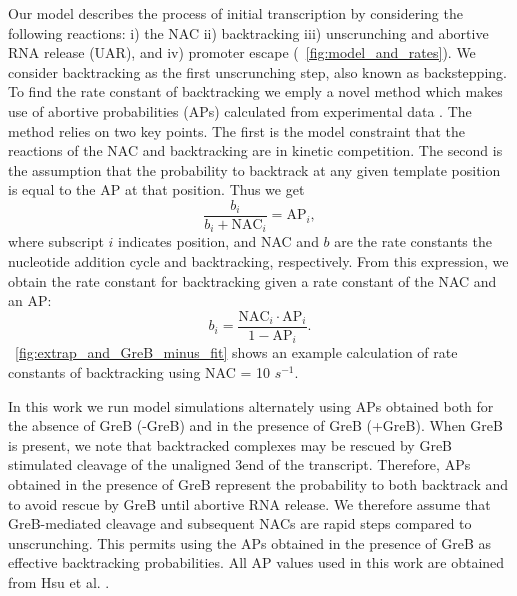%
Our model describes the process of initial transcription by considering the
following reactions: i) the NAC ii) backtracking iii) unscrunching and abortive
RNA release (UAR), and iv) promoter escape (\FIG~\ref{fig:model_and_rates}).
We consider backtracking as the first unscrunching step, also known as
backstepping. To find the rate constant of
backtracking we emply a novel method which makes use of abortive probabilities
(APs) calculated from experimental data \cite{hsu_quantitative_1996}. The
method relies on two key points. The first is the model constraint that the
reactions of the NAC and backtracking are in kinetic competition. The second
is the assumption that the probability to backtrack at any given template
position is equal to the AP at that position. Thus we get
\begin{equation*}
    \frac{b_i}{b_i + \text{NAC}_i} = \text{AP}_i,
\end{equation*}
where subscript $i$ indicates position, and NAC and $b$ are the rate constants
the nucleotide addition cycle and backtracking, respectively. From this
expression, we obtain the rate constant for backtracking given a rate constant
of the NAC and an AP:
\begin{equation}
  b_i = \frac{\text{NAC}_i\cdot\text{AP}_i}{1-\text{AP}_i}.
  \label{eq:backtrackingcalc}
\end{equation}
\FIG~\ref{fig:extrap_and_GreB_minus_fit} shows an example calculation of rate
constants of backtracking using NAC = 10 $s^{-1}$.

In this work we run model simulations alternately using APs obtained both for
the absence of GreB (-GreB) and in the presence of GreB (+GreB). When GreB is
present, we note that backtracked complexes may be rescued by GreB stimulated
cleavage of the unaligned 3\ppp end of the transcript. Therefore, APs obtained
in the presence of GreB represent the probability to both backtrack and to
avoid rescue by GreB until abortive RNA release. We therefore assume that
GreB-mediated cleavage and subsequent NACs are rapid steps compared to
unscrunching. This permits using the APs obtained in the presence of GreB as
effective backtracking probabilities. All AP values used in this work are
obtained from Hsu et al. \cite{hsu_initial_2006}.


